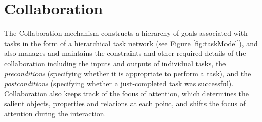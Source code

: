 \documentclass{article}
\begin{document}
% 
% 
% 
% 

\vspace*{-3mm}
\section{Collaboration}

The Collaboration mechanism constructs a hierarchy of goals associated with
tasks in the form of a hierarchical task network (see Figure
\ref{fig:taskModel}), and also manages and maintains the constraints and other
required details of the collaboration including the inputs and outputs of
individual tasks, the \textit{preconditions} (specifying whether it is
appropriate to perform a task), and the \textit{postconditions} (specifying
whether a just-completed task was successful). Collaboration also keeps track of
the focus of attention, which determines the salient objects, properties and
relations at each point, and shifts the focus of attention during the
interaction.
\end{document}
